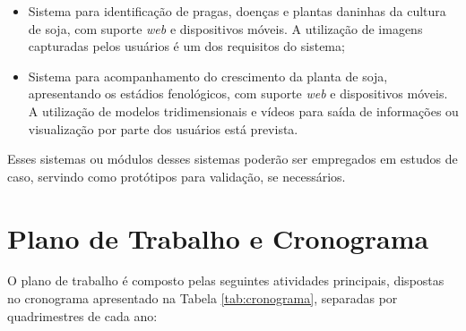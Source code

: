 \documentclass[12pt]{article}
\begin{document}
\begin{itemize}
	\item Sistema para identificação de pragas, doenças e plantas daninhas da cultura de soja, com suporte \textit{web} e dispositivos móveis. A utilização de imagens capturadas pelos usuários é um dos requisitos do sistema;

	\item Sistema para acompanhamento do crescimento da planta de soja, apresentando os estádios fenológicos, com suporte \textit{web} e dispositivos móveis. A utilização de modelos tridimensionais e vídeos para saída de informações ou visualização por parte dos usuários está prevista.
\end{itemize}

Esses sistemas ou módulos desses sistemas poderão ser empregados em estudos de caso, servindo como protótipos para validação, se necessários. 

\section{Plano de Trabalho e Cronograma}
\label{sec:plano_trabalho_cronograma}

O plano de trabalho é composto pelas seguintes atividades principais, dispostas no cronograma apresentado na Tabela \ref{tab:cronograma}, separadas por quadrimestres de cada ano:
\end{document}
